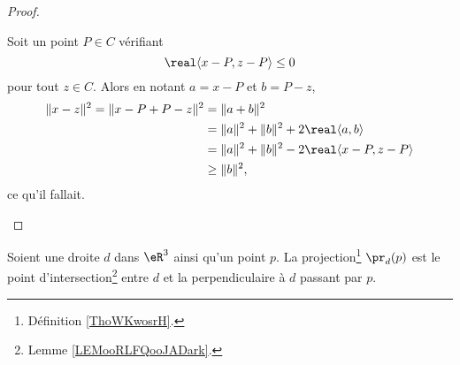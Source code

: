 \begin{proof}
\begin{subproof}
		\spitem[\ref{zzETsfYCSItemii}\( \Rightarrow\)~\ref{zzETsfYCSItemi}]

		Soit un point \( P\in C\) vérifiant
		\begin{equation}
			\real\langle x-P, z-P\rangle \leq 0
		\end{equation}
		pour tout \( z\in C\). Alors en notant \( a=x-P\) et \( b=P-z\),
		\begin{equation}
			\begin{aligned}[]
				\| x-z \|^2=\| x-P+P-z \|^2 & =\| a+b \|^2                                       \\
				                            & =\| a \|^2+\| b \|^2+2\real\langle a, b\rangle     \\
				                            & =\| a \|^2+\| b \|^2-2\real\langle x-P, z-P\rangle \\
				                            & \geq \| b \|^2,
			\end{aligned}
		\end{equation}
		ce qu'il fallait.
	\end{subproof}
\end{proof}

\begin{proposition}     \label{PROPooHGGIooIssaTA}
	Soient une droite \( d\) dans \( \eR^3\) ainsi qu'un point \( p\). La projection\footnote{Définition \ref{ThoWKwosrH}.} \( \pr_d(p)\) est le point d'intersection\footnote{Lemme \ref{LEMooRLFQooJADark}.} entre \( d\) et la perpendiculaire à \( d\) passant par \( p\).
\end{proposition}

